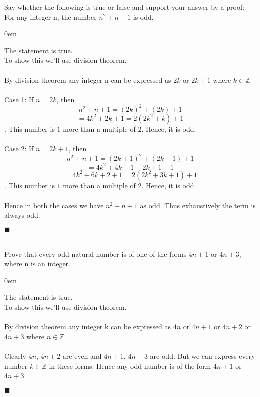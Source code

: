 \documentclass[12pt]{article}
\newcommand{\Z}{\mathbb{Z}}
\renewcommand{\qed}{\hfill$\blacksquare$}
\renewenvironment{proof}{\begin{addmargin}[1em]{0em}\begin{newproof}}{\end{newproof}\end{addmargin}\qed}
\newenvironment{problem}[2][Problem]{\begin{trivlist}
\item[\hskip \labelsep {\bfseries #1}\hskip \labelsep {\bfseries #2.}]}{\end{trivlist}}
\begin{document}
 
 
 
\begin{problem}{3} Say whether the following is true or false and support your answer by a proof: For any integer n, the number $ n^2 + n + 1 $ is odd.
\end{problem}

\begin{proof}
The statement is true.\\
To show this we'll use division theorem. \\ \\
By division theorem any integer n can be expressed as $2k$ or $2k+1$ where $k \in \Z$ \\ \\
Case 1: If $n = 2k$, then $$ n^2 + n + 1 =  (2k)^2 + (2k) + 1 $$
$$ = 4k^2 + 2k + 1 = 2(2k^2 + k) + 1$$. 
This number is $1$ more than a multiple of $2$. Hence, it is odd. \\ \\
Case 2: If $n = 2k+1$, then $$n^2 + n + 1 = (2k+1)^2 + (2k+1) +1$$
$$ = 4k^2 + 4k + 1 + 2k + 1 + 1$$
$$ = 4k^2 + 6k + 2 + 1 = 2(2k^2 + 3k + 1) + 1$$.
This number is $1$ more than a multiple of $2$. Hence, it is odd.\\ \\
Hence in both the cases we have $n^2 + n + 1$ as odd. Thus exhaustively the term is always odd.
\end{proof}
 \\
 \\
 
 
 
\begin{problem}{4}  Prove that every odd natural number is of one of the forms $4n + 1$ or $4n + 3$, where n is an integer.
\end{problem}

\begin{proof}
The statement is true.\\
To show this we'll use division theorem. \\ \\
By division theorem any integer k can be expressed as $4n$ or $4n+1$ or $4n+2$ or $4n+3$ where $n \in \Z$ \\ \\
Clearly $4n$, $4n+2$ are even and $4n+1$, $4n+3$  are odd. But we can express every number $k \in \Z$ in these forms.
Hence any odd number is of the form $4n+1$ or $4n+3$.
\end{proof}
 \\
 \\
 
\end{document}
